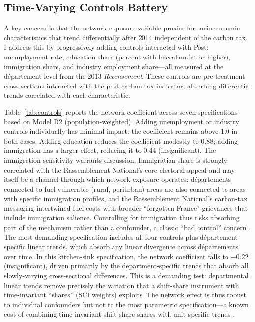 \documentclass[12pt]{article}
\newcommand{\rn}{Rassemblement National}
\newcommand{\dept}{d\'{e}partement}
\newcommand{\depts}{d\'{e}partements}
\begin{document}
\subsection{Time-Varying Controls Battery}

A key concern is that the network exposure variable proxies for socioeconomic characteristics that trend differentially after 2014 independent of the carbon tax. I address this by progressively adding controls interacted with Post: unemployment rate, education share (percent with baccalaur\'{e}at or higher), immigration share, and industry employment share---all measured at the \dept{} level from the 2013 \textit{Recensement}. These controls are pre-treatment cross-sections interacted with the post-carbon-tax indicator, absorbing differential trends correlated with each characteristic.

Table~\ref{tab:controls} reports the network coefficient across seven specifications based on Model D2 (population-weighted). Adding unemployment or industry controls individually has minimal impact: the coefficient remains above 1.0 in both cases. Adding education reduces the coefficient modestly to 0.88; adding immigration has a larger effect, reducing it to 0.44 (insignificant). The immigration sensitivity warrants discussion. Immigration share is strongly correlated with the \rn{}'s core electoral appeal and may itself be a channel through which network exposure operates: \depts{} connected to fuel-vulnerable (rural, periurban) areas are also connected to areas with specific immigration profiles, and the \rn{}'s carbon-tax messaging intertwined fuel costs with broader ``forgotten France'' grievances that include immigration salience. Controlling for immigration thus risks absorbing part of the mechanism rather than a confounder, a classic ``bad control'' concern \citep{angrist2009mostly}. The most demanding specification includes all four controls plus \dept{}-specific linear trends, which absorb any linear divergence across \depts{} over time. In this kitchen-sink specification, the network coefficient falls to $-0.22$ (insignificant), driven primarily by the department-specific trends that absorb all slowly-varying cross-sectional differences. This is a demanding test: departmental linear trends remove precisely the variation that a shift-share instrument with time-invariant ``shares'' (SCI weights) exploits. The network effect is thus robust to individual confounders but not to the most parametric specification---a known cost of combining time-invariant shift-share shares with unit-specific trends \citep{adao2019shift}.
\end{document}

